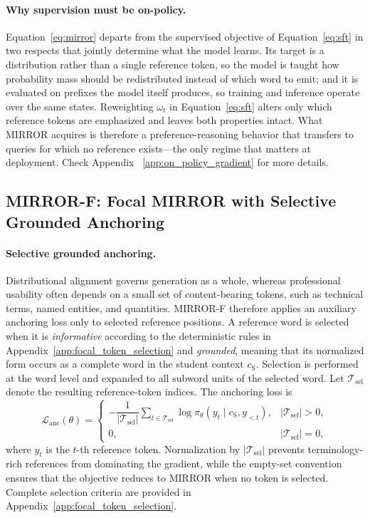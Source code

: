 \documentclass{article} %
\begin{document}
\paragraph{Why supervision must be on-policy.}
Equation~\ref{eq:mirror} departs from the supervised objective of Equation~\ref{eq:sft} in two respects that jointly determine what the model learns. Its target is a distribution rather than a single reference token, so the model is taught how probability mass should be redistributed instead of which word to emit; and it is evaluated on prefixes the model itself produces, so training and inference operate over the same states. Reweighting $\omega_t$ in Equation~\ref{eq:sft} alters only which reference tokens are emphasized and leaves both properties intact. What MIRROR acquires is therefore a preference-reasoning behavior that transfers to queries for which no reference exists---the only regime that matters at deployment. Check Appendix ~\ref{app:on_policy_gradient} for more details.

\subsection{MIRROR-F: Focal MIRROR with Selective Grounded Anchoring}
\label{sec:mirrorf}

\paragraph{Selective grounded anchoring.}
Distributional alignment governs generation as a whole, whereas professional
usability often depends on a small set of content-bearing tokens, such as
technical terms, named entities, and quantities. MIRROR-F therefore applies
an auxiliary anchoring loss only to selected reference positions. A reference
word is selected when it is \emph{informative} according to the deterministic
rules in Appendix~\ref{app:focal_token_selection} and \emph{grounded}, meaning
that its normalized form occurs as a complete word in the student context
$c_{\mathrm{S}}$. Selection is performed at the word level and expanded to
all subword units of the selected word. Let
$\mathcal{T}_{\mathrm{sel}}$ denote the resulting reference-token indices.
The anchoring loss is
\begin{equation}
\mathcal{L}_{\mathrm{anc}}(\theta)
=
\begin{cases}
-\dfrac{1}{|\mathcal{T}_{\mathrm{sel}}|}
\displaystyle\sum_{t\in\mathcal{T}_{\mathrm{sel}}}
\log \pi_\theta\!\left(y_t\mid c_{\mathrm{S}},y_{<t}\right),
&
|\mathcal{T}_{\mathrm{sel}}|>0,
\\[10pt]
0,
&
|\mathcal{T}_{\mathrm{sel}}|=0,
\end{cases}
\tag{5}
\label{eq:anchor}
\end{equation}
where $y_t$ is the $t$-th reference token. Normalization by
$|\mathcal{T}_{\mathrm{sel}}|$ prevents terminology-rich references from
dominating the gradient, while the empty-set convention ensures that the
objective reduces to MIRROR when no token is selected. Complete selection
criteria are provided in Appendix~\ref{app:focal_token_selection}.
\end{document}
